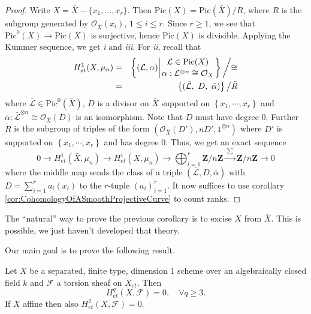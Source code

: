 \begin{proof}
Write $X = \bar X - \{ x_1, \dots, x_r\}$. Then $\text{Pic}(X) = 
\text{Pic}(\bar X)/ R$, where $R$ is the subgroup generated by 
$\mathcal{O}_{\bar X}(x_i)$, $1 \leq i \leq r$. Since $r \geq 1$, we see that 
$\text{Pic}^0(X) \to \text{Pic}(X)$ is surjective, hence $\text{Pic}(X)$ is 
divisible. Applying the Kummer sequence, we get {\it i} and {\it iii}. For {\it 
ii}, recall that
\begin{eqnarray*}
H_{et}^1(X, \mu_n) & = &
\left\{
{(\mathcal L, \alpha) {\bigg |} {{\mathcal L \in \text{Pic}(X) }
\atop 
{\alpha: \mathcal L^{\otimes n} \cong \mathcal{O}_X}}}
\right\}
{\bigg /} {\cong} \\
& = & 
\left\{(\bar{\mathcal L}, \ D, \ \bar \alpha) \right\} {\big /} \tilde{R}
\end{eqnarray*}
where $\bar{\mathcal L} \in \text{Pic}^0(\bar X)$, $D$ is a divisor on $\bar X$ 
supported on $\left\{x_1, \cdots, x_r\right\}$ and $ \bar{\alpha}: 
\bar{\mathcal L}^{\otimes n} \cong \mathcal{O}_{\bar{X}}(D)$ is an isomorphism. 
Note that $D$ must have degree 0. Further $\tilde{R}$ is the subgroup of 
triples of the form $(\mathcal{O}_{\bar X}(D'), n D', 1^{\otimes n})$ where 
$D'$ is supported on $\left\{x_1, \cdots, x_r\right\}$ and has degree 0. Thus, 
we get an exact sequence
$$
0 \longrightarrow
H_{et}^1(\bar X, \mu_n) \longrightarrow
H_{et}^1(X, \mu_n)  \longrightarrow
\bigoplus_{i=1}^r \mathbf{Z}/n\mathbf{Z} 
\xrightarrow{\ \sum\ }
\mathbf{Z}/n\mathbf{Z} \longrightarrow 0
$$
where the middle map sends the class of a triple $(\bar{ \mathcal L}, D, \bar 
\alpha)$ with $D = \sum_{i=1}^r a_i (x_i)$ to the $r$-tuple $(a_i)_{i=1}^r$. It 
now suffices to use corollary \ref{cor:CohomologyOfASmoothProjectiveCurve} to 
count ranks.
\end{proof}

\begin{remark}
The ``natural'' way to prove the previous corollary is to excise $X$ from $\bar 
X$. This is possible, we just haven't developed that theory.
\end{remark}

\noindent
Our main goal is to prove the following result.

\begin{theorem} \label{thm:vanishingForCurves}
Let $X$ be a separated, finite type, dimension $1$ scheme over an algebraically 
closed field $k$ and  $\mathcal{F}$ a torsion sheaf on $X_{et}$. Then 
$$
H_{et}^q(X, \mathcal{F}) = 0, \quad \forall q\geq 3.
$$ 
If $X$ affine then also $H_{et}^2(X, \mathcal{F}) = 0$. 
\end{theorem}	

